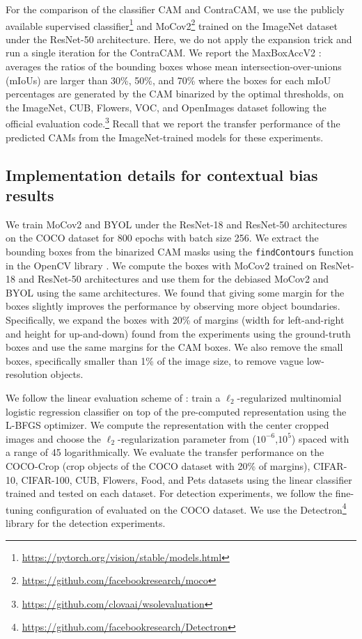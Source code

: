 For the comparison of the classifier CAM and ContraCAM, we use the publicly available supervised classifier\footnote{\url{https://pytorch.org/vision/stable/models.html}} and MoCov2\footnote{\url{https://github.com/facebookresearch/moco}} trained on the ImageNet dataset under the ResNet-50 architecture. Here, we do not apply the expansion trick and run a single iteration for the ContraCAM. We report the MaxBoxAccV2 \citep{choe2020evaluating}: averages the ratios of the bounding boxes whose mean intersection-over-unions (mIoUs) are larger than 30\%, 50\%, and 70\% where the boxes for each mIoU percentages are generated by the CAM binarized by the optimal thresholds, on the ImageNet, CUB, Flowers, VOC, and OpenImages dataset following the official evaluation code.\footnote{\url{https://github.com/clovaai/wsolevaluation}} Recall that we report the transfer performance of the predicted CAMs from the ImageNet-trained models for these experiments.


\subsection{Implementation details for contextual bias results}
\label{sec:details-multi}

We train MoCov2 and BYOL under the ResNet-18 and ResNet-50 architectures on the COCO dataset for 800 epochs with batch size 256. We extract the bounding boxes from the binarized CAM masks using the \texttt{findContours} function in the OpenCV library \citep{opencv_library}. We compute the boxes with MoCov2 trained on ResNet-18 and ResNet-50 architectures and use them for the debiased MoCov2 and BYOL using the same architectures. We found that giving some margin for the boxes slightly improves the performance by observing more object boundaries. Specifically, we expand the boxes with 20\% of margins (width for left-and-right and height for up-and-down) found from the experiments using the ground-truth boxes and use the same margins for the CAM boxes. We also remove the small boxes, specifically smaller than 1\% of the image size, to remove vague low-resolution objects.

We follow the linear evaluation scheme of \citet{chen2020simple}: train a $\ell_2$-regularized multinomial logistic regression classifier on top of the pre-computed representation using the L-BFGS \citep{liu1989limited} optimizer. We compute the representation with the center cropped images and choose the $\ell_2$-regularization parameter from ($10^{-6}$,$10^5$) spaced with a range of 45 logarithmically. We evaluate the transfer performance on the COCO-Crop (crop objects of the COCO dataset with 20\% of margins), CIFAR-10, CIFAR-100, CUB, Flowers, Food, and Pets datasets using the linear classifier trained and tested on each dataset. For detection experiments, we follow the fine-tuning configuration of \citet{he2020momentum} evaluated on the COCO dataset. We use the Detectron\footnote{\url{https://github.com/facebookresearch/Detectron}} library for the detection experiments.


